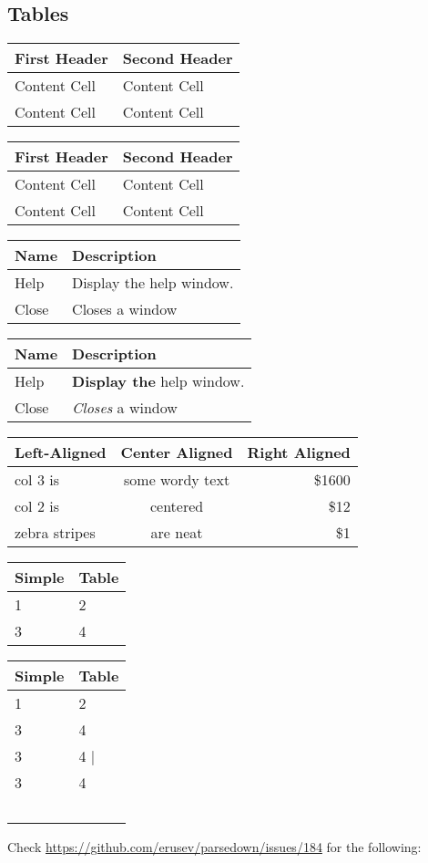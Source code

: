 \subsection{Tables}
\begin{tabular}{|l|l|}\hline
First Header  & Second Header\\ \hline
Content Cell  & Content Cell\\ \hline
Content Cell  & Content Cell\\ \hline
\end{tabular}
\begin{tabular}{|l|l|}\hline
First Header  & Second Header\\ \hline
Content Cell  & Content Cell\\ \hline
Content Cell  & Content Cell\\ \hline
\end{tabular}
\begin{tabular}{|l|l|}\hline
Name & Description\\ \hline
Help      & Display the help window.\\ \hline
Close     & Closes a window\\ \hline
\end{tabular}
\begin{tabular}{|l|l|}\hline
Name & Description\\ \hline
Help      & \textbf{Display the} help window.\\ \hline
Close     & \textit{Closes} a window\\ \hline
\end{tabular}
\begin{tabular}{|l|c|r|}\hline
Left-Aligned  & Center Aligned  & Right Aligned\\ \hline
col 3 is      & some wordy text & \$1600\\ \hline
col 2 is      & centered        &   \$12\\ \hline
zebra stripes & are neat        &    \$1\\ \hline
\end{tabular}
\begin{tabular}{|l|l|}\hline
Simple & Table\\ \hline
1      & 2\\ \hline
3      & 4\\ \hline
\end{tabular}
\begin{tabular}{|l|l|}\hline
Simple & Table\\ \hline
1      & 2\\ \hline
3      & 4\\ \hline
3      & 4     |\\ \hline
3      & 4    \\\ \hline
\end{tabular}
Check \url{https://github.com/erusev/parsedown/issues/184} for the following:

